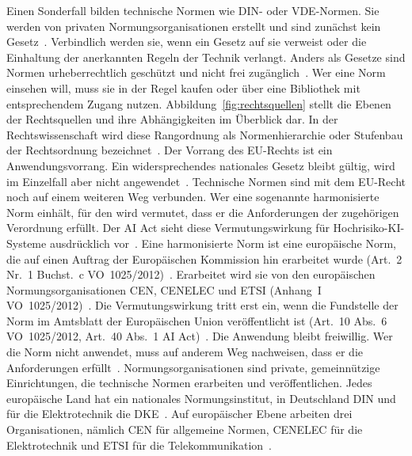 Einen Sonderfall bilden technische Normen wie DIN- oder VDE-Normen.
Sie werden von privaten Normungsorganisationen erstellt und sind zunächst kein Gesetz~\cite{bgh1998din}.
Verbindlich werden sie, wenn ein Gesetz auf sie verweist oder die Einhaltung der anerkannten Regeln der Technik verlangt.
Anders als Gesetze sind Normen urheberrechtlich geschützt und nicht frei zugänglich~\cite{urhg}.
Wer eine Norm einsehen will, muss sie in der Regel kaufen oder über eine Bibliothek mit entsprechendem Zugang nutzen.
Abbildung~\ref{fig:rechtsquellen} stellt die Ebenen der Rechtsquellen und ihre Abhängigkeiten im Überblick dar.
In der Rechtswissenschaft wird diese Rangordnung als Normenhierarchie oder Stufenbau der Rechtsordnung bezeichnet~\cite{kelsen1960}.
Der Vorrang des EU-Rechts ist ein Anwendungsvorrang.
Ein widersprechendes nationales Gesetz bleibt gültig, wird im Einzelfall aber nicht angewendet~\cite{simmenthal1978}.
Technische Normen sind mit dem EU-Recht noch auf einem weiteren Weg verbunden.
Wer eine sogenannte harmonisierte Norm einhält, für den wird vermutet, dass er die Anforderungen der zugehörigen Verordnung erfüllt.
Der AI Act sieht diese Vermutungswirkung für Hochrisiko-KI-Systeme ausdrücklich vor~\cite{aiact2024}.
Eine harmonisierte Norm ist eine europäische Norm, die auf einen Auftrag der Europäischen Kommission hin erarbeitet wurde (Art.~2 Nr.~1 Buchst.~c VO~1025/2012)~\cite{vo1025}.
Erarbeitet wird sie von den europäischen Normungsorganisationen CEN, CENELEC und ETSI (Anhang~I VO~1025/2012)~\cite{vo1025}.
Die Vermutungswirkung tritt erst ein, wenn die Fundstelle der Norm im Amtsblatt der Europäischen Union veröffentlicht ist (Art.~10 Abs.~6 VO~1025/2012, Art.~40 Abs.~1 AI Act)~\cite{vo1025,aiact2024}.
Die Anwendung bleibt freiwillig.
Wer die Norm nicht anwendet, muss auf anderem Weg nachweisen, dass er die Anforderungen erfüllt~\cite{blueguide2022}.
Normungsorganisationen sind private, gemeinnützige Einrichtungen, die technische Normen erarbeiten und veröffentlichen.
Jedes europäische Land hat ein nationales Normungsinstitut, in Deutschland DIN und für die Elektrotechnik die DKE~\cite{din_web}.
Auf europäischer Ebene arbeiten drei Organisationen, nämlich CEN für allgemeine Normen, CENELEC für die Elektrotechnik und ETSI für die Telekommunikation~\cite{cencenelec_web,etsi_web}.
